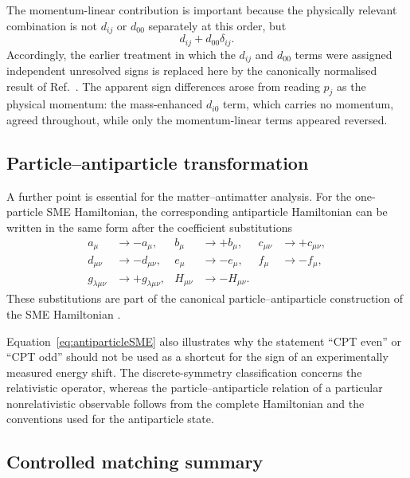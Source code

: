 \documentclass[aps,prd,reprint,superscriptaddress,nofootinbib]{revtex4-2}
\begin{document}
	The momentum-linear contribution is important because the physically
	relevant combination is not $d_{ij}$ or $d_{00}$ separately at this
	order, but
	\begin{equation}
		d_{ij}+d_{00}\delta_{ij}.
		\label{eq:dcombination}
	\end{equation}
	Accordingly, the earlier treatment in which the $d_{ij}$ and $d_{00}$
terms were assigned independent unresolved signs is replaced here by the
canonically normalised result of Ref.~\cite{KosteleckyLane1999}. The
apparent sign differences arose from reading $p_j$ as the physical
momentum: the mass-enhanced $d_{i0}$ term, which carries no momentum,
agreed throughout, while only the momentum-linear terms appeared
reversed.
	
	\subsection{Particle--antiparticle transformation}
	
	A further point is essential for the matter--antimatter analysis.
	For the one-particle SME Hamiltonian, the corresponding antiparticle
	Hamiltonian can be written in the same form after the coefficient
	substitutions
	\begin{equation}
		\begin{aligned}
			a_\mu&\rightarrow -a_\mu,
			&
			b_\mu&\rightarrow +b_\mu,
			&
			c_{\mu\nu}&\rightarrow +c_{\mu\nu},
			\\
			d_{\mu\nu}&\rightarrow -d_{\mu\nu},
			&
			e_\mu&\rightarrow -e_\mu,
			&
			f_\mu&\rightarrow -f_\mu,
			\\
			g_{\lambda\mu\nu}&\rightarrow +g_{\lambda\mu\nu},
			&
			H_{\mu\nu}&\rightarrow -H_{\mu\nu}.
		\end{aligned}
		\label{eq:antiparticleSME}
	\end{equation}
	These substitutions are part of the canonical particle--antiparticle
	construction of the SME Hamiltonian \cite{KosteleckyLane1999}.
	
	Equation~\eqref{eq:antiparticleSME} also illustrates why the statement
	``CPT even'' or ``CPT odd'' should not be used as a shortcut for the
	sign of an experimentally measured energy shift. The discrete-symmetry
	classification concerns the relativistic operator, whereas the
	particle--antiparticle relation of a particular nonrelativistic
	observable follows from the complete Hamiltonian and the conventions
	used for the antiparticle state.
	
	\subsection{Controlled matching summary}
	
\end{document}

